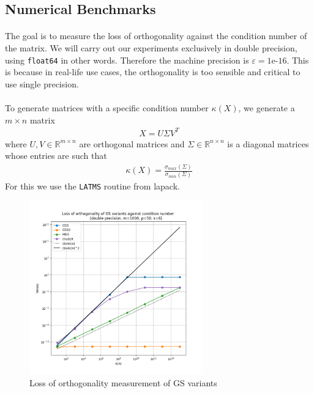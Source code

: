 \newpage
\subsection{Numerical Benchmarks}
\paragraph*{}
The goal is to measure the loss of orthogonality against the condition number of the matrix. We will carry out our experiments exclusively in double precision, using \texttt{float64} in other words. Therefore the machine precision is $\varepsilon = 1\text{e-}16$. This is because in real-life use cases, the orthogonality is too sensible and critical to use single precision.

\paragraph*{}
To generate matrices with a specific condition number $\kappa(X)$, we generate a $m \times n$ matrix
\begin{align*}
    X = U\Sigma V^T
\end{align*}
where $U, V \in \mathbb{R}^{m \times n}$ are orthogonal matrices and $\Sigma \in \mathbb{R}^{n \times n}$ is a diagonal matrices whose entries are such that 
\begin{align*}
\kappa(X) = \frac{\sigma_{max}(\Sigma)}{\sigma_{min}(\Sigma)}
\end{align*}
For this we use the  \texttt{LATMS} routine from \acrshort{lapack}.

\begin{figure}[h]
\includegraphics[width=0.67\textwidth]{results/orthogo_bench/numerical_bench_gs.png}
\centering
\caption{Loss of orthogonality measurement of GS variants}
\label{fig:num_gs}
\end{figure}

